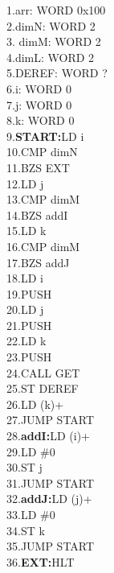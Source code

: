\documentclass{article}
\begin{document}
\begin{minipage}{.5\textwidth}
        1.arr: WORD 0x100\\
        2.dimN: WORD 2\\
       3. dimM: WORD 2\\
        4.dimL: WORD 2\\
        5.DEREF: WORD ?\\
        6.i: WORD 0\\
        7.j: WORD 0\\
        8.k: WORD 0\\
        9.\textbf{START:}LD i\\
            10.CMP dimN\\
            11.BZS EXT\\
            12.LD j\\
            13.CMP dimM\\
            14.BZS addI\\
            15.LD k\\
            16.CMP dimM\\
            17.BZS addJ\\
            18.LD i\\
            19.PUSH\\
            20.LD j\\
            21.PUSH\\
            22.LD k\\
            23.PUSH\\
            24.CALL GET\\
            25.ST DEREF\\
            26.LD (k)+\\
            27.JUMP START\\
            28.\textbf{addI:}LD (i)+\\
            29.LD \#0\\
            30.ST j\\
            31.JUMP START\\
            32.\textbf{addJ:}LD (j)+\\
            33.LD \#0\\
            34.ST k\\
            35.JUMP START\\
            36.\textbf{EXT:}HLT\\
\end{minipage}
\begin{minipage}{.4\textwidth}
  
\end{minipage}
\end{document}
